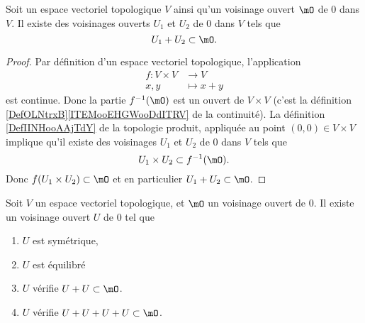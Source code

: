 \begin{lemma}     \label{LEMooQEFRooHAxOys}
	Soit un espace vectoriel topologique \( V\) ainsi qu'un voisinage ouvert \( \mO\) de \( 0\) dans \( V\). Il existe des voisinages ouverts \( U_1\) et \( U_2\) de \( 0\) dans \( V\) tels que
	\begin{equation}
		U_1+U_2\subset \mO.
	\end{equation}
\end{lemma}

\begin{proof}
	Par définition d'un espace vectoriel topologique, l'application
	\begin{equation}
		\begin{aligned}
			f\colon V\times V & \to V       \\
			x,y               & \mapsto x+y
		\end{aligned}
	\end{equation}
	est continue. Donc la partie \( f^{-1}(\mO)\) est un ouvert de \( V\times V\) (c'est la définition \ref{DefOLNtrxB}\ref{ITEMooEHGWooDdITRV} de la continuité). La définition \ref{DefIINHooAAjTdY} de la topologie produit, appliquée au point \( (0,0)\in V\times V\) implique qu'il existe des voisinages \( U_1\) et \( U_2\) de \( 0\) dans \( V\) tels que
	\begin{equation}
		U_1\times U_2\subset f^{-1}(\mO).
	\end{equation}
	Donc \( f(U_1\times U_2)\subset\mO\) et en particulier \( U_1+U_2\subset \mO\).
\end{proof}

\begin{proposition}\label{PROPSommeTopologique}
	Soit \( V \) un espace vectoriel topologique, et \( \mO \) un voisinage ouvert de \( 0 \). Il existe un voisinage ouvert \( U\) de \( 0 \) tel que
	\begin{enumerate}
		\item
		      \( U\) est symétrique,
		\item
		      \( U\) est équilibré
		\item
		      \( U\) vérifie \( U + U \subset \mO \).
		\item
		      \( U\) vérifie \( U + U + U + U \subset \mO \).
	\end{enumerate}
\end{proposition}

